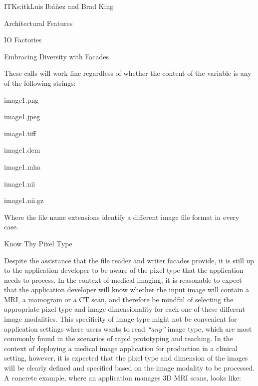 \begin{aosachapter}{ITK}{s:itk}{Luis Ib\'{a}\~{n}ez and Brad King}
\begin{aosasect1}{Architectural Features}
\begin{aosasect2}{IO Factories}
\begin{aosasect3}{Embracing Diversity with Facades}
\begin{aosaitemize}
\item {}
\item {}
\item {}
\end{aosaitemize}

\noindent These calls will work fine regardless of whether the content of the
 variable is any of the following strings:

\begin{aosaitemize}
\item image1.png
\item image1.jpeg
\item image1.tiff
\item image1.dcm
\item image1.mha
\item image1.nii
\item image1.nii.gz
\end{aosaitemize}

\noindent Where the file name extensions identify a different image file
format in every case.

\end{aosasect3}

\begin{aosasect3}{Know Thy Pixel Type}

Despite the assistance that the file reader and writer facades provide, it is
still up to the application developer to be aware of the pixel type that the
application needs to process. In the context of medical imaging, it is
reasonable to expect that the application developer will know whether the input
image will contain a MRI, a mamogram or a CT scan, and therefore be mindful of
selecting the appropriate pixel type and image dimensionality for each one of
these different image modalities. This specificity of image type might not be
convenient for application settings where users wants to read \emph{``any''}
image type, which are most commonly found in the scenarios of rapid prototyping
and teaching.  In the context of deploying a medical image application for
production in a clinical setting, however, it is expected that the pixel type
and dimension of the images will be clearly defined and specified based on the
image modality to be processed. A concrete example, where an application manages 3D MRI scans, looks like:


\end{aosasect3}
\end{aosasect2}
\end{aosasect1}
\end{aosachapter}

